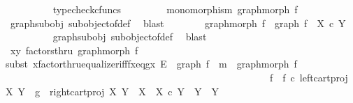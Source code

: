 \begin{isabellebody}
\ \ \ \ \ \ \ \ \isamarkupfalse%
\ typecheck{\isacharunderscore}{\kern0pt}cfuncs\ \isanewline
\ \ \ \ \ \ \isamarkupfalse%
\ {\isachardoublequoteopen}monomorphism\ {\isacharparenleft}{\kern0pt}graph{\isacharunderscore}{\kern0pt}morph\ f{\isacharparenright}{\kern0pt}{\isachardoublequoteclose}\isanewline
\ \ \ \ \ \ \ \ \isamarkupfalse%
\ graph{\isacharunderscore}{\kern0pt}subobj\ subobject{\isacharunderscore}{\kern0pt}of{\isacharunderscore}{\kern0pt}def{}\ \isamarkupfalse%
\ blast\isanewline
\ \ \ \ \ \ \isamarkupfalse%
\ {\isachardoublequoteopen}graph{\isacharunderscore}{\kern0pt}morph\ f\ {\isacharcolon}{\kern0pt}\ graph\ f\ {\isasymrightarrow}\ X\ {\isasymtimes}\isactrlsub c\ Y{\isachardoublequoteclose}\isanewline
\ \ \ \ \ \ \ \ \isamarkupfalse%
\ graph{\isacharunderscore}{\kern0pt}subobj\ subobject{\isacharunderscore}{\kern0pt}of{\isacharunderscore}{\kern0pt}def{}\ \isamarkupfalse%
\ blast\isanewline
\ \ \ \ \ \ \isamarkupfalse%
\ {\isachardoublequoteopen}{\isasymlangle}x{\isacharcomma}{\kern0pt}y{\isasymrangle}\ factorsthru\ graph{\isacharunderscore}{\kern0pt}morph\ f{\isachardoublequoteclose}\isanewline
\ \ \ \ \ \ \isamarkupfalse%
{\isacharparenleft}{\kern0pt}subst\ xfactorthru{\isacharunderscore}{\kern0pt}equalizer{\isacharunderscore}{\kern0pt}iff{\isacharunderscore}{\kern0pt}fx{\isacharunderscore}{\kern0pt}eq{\isacharunderscore}{\kern0pt}gx{\isacharbrackleft}{\kern0pt}\ E\ {\isacharequal}{\kern0pt}\ {\isachardoublequoteopen}graph\ f{\isachardoublequoteclose}{\isacharcomma}{\kern0pt}\ \ m\ {\isacharequal}{\kern0pt}\ {\isachardoublequoteopen}graph{\isacharunderscore}{\kern0pt}morph\ f{\isachardoublequoteclose}{\isacharcomma}{\kern0pt}\ \ \isanewline
\ \ \ \ \ \ \ \ \ \ \ \ \ \ \ \ \ \ \ \ \ \ \ \ \ \ \ \ \ \ \ \ \ \ \ \ \ \ \ \ \ \ \ \ \ \ \ \ \ \ \ \ \ \ f\ {\isacharequal}{\kern0pt}\ {\isachardoublequoteopen}{\isacharparenleft}{\kern0pt}f\ {\isasymcirc}\isactrlsub c\ left{\isacharunderscore}{\kern0pt}cart{\isacharunderscore}{\kern0pt}proj\ X\ Y{\isacharparenright}{\kern0pt}{\isachardoublequoteclose}{\isacharcomma}{\kern0pt}\ \ g\ {\isacharequal}{\kern0pt}\ {\isachardoublequoteopen}right{\isacharunderscore}{\kern0pt}cart{\isacharunderscore}{\kern0pt}proj\ X\ Y{\isachardoublequoteclose}{\isacharcomma}{\kern0pt}\ \ X\ {\isacharequal}{\kern0pt}\ {\isachardoublequoteopen}X\ {\isasymtimes}\isactrlsub c\ Y{\isachardoublequoteclose}{\isacharcomma}{\kern0pt}\ \ Y\ {\isacharequal}{\kern0pt}\ Y{\isacharcomma}{\kern0pt}\isanewline

\end{isabellebody}
